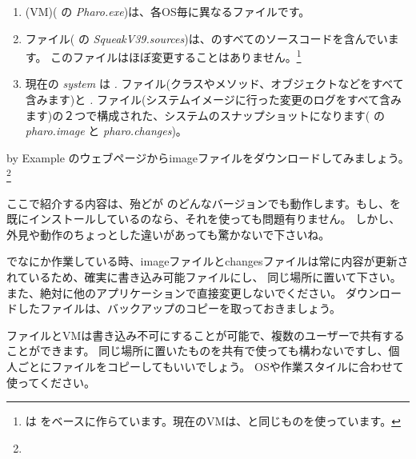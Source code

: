 \documentclass[a4paper,10pt,twoside]{book}
\begin{document}
\begin{enumerate}

  \item {} (VM)( の \textit{Pharo.exe})は、各OS毎に異なるファイルです。

  \item {}ファイル( の \emph{SqueakV39.sources})は、\pharo のすべてのソースコードを含んでいます。
このファイルはほぼ変更することはありません。\footnote{\pharo は をベースに作らています。現在のVMは、\squeak と同じものを使っています。}

  \item 現在の \emph{system } は \emph{.} ファイル(クラスやメソッド、オブジェクトなどをすべて含みます)と \emph{.} ファイル(システムイメージに行った変更のログをすべて含みます)の２つで構成された、\pharo システムのスナップショットになります( の \emph{pharo.image} と \emph{pharo.changes})。
\end{enumerate}

\pharo by Example のウェブページからimageファイルをダウンロードしてみましょう。\footnote{\pbe}

ここで紹介する内容は、殆どが \pharo のどんなバージョンでも動作します。もし、\pharo を既にインストールしているのなら、それを使っても問題有りません。
しかし、外見や動作のちょっとした違いがあっても驚かないで下さいね。

\pharo でなにか作業している時、imageファイルとchangesファイルは常に内容が更新されているため、確実に書き込み可能ファイルにし、
同じ場所に置いて下さい。
また、絶対に他のアプリケーションで直接変更しないでください。
ダウンロードしたファイルは、バックアップのコピーを取っておきましょう。

 ファイルとVMは書き込み不可にすることが可能で、複数のユーザーで共有することができます。
同じ場所に置いたものを共有で使っても構わないですし、個人ごとにファイルをコピーしてもいいでしょう。
OSや作業スタイルに合わせて使ってください。

\end{document}
